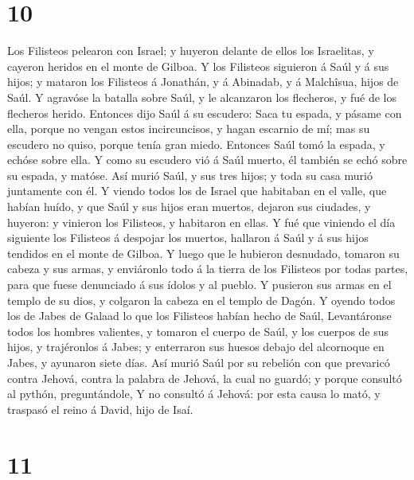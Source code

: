 \hypertarget{section-9}{%
\section{10}\label{section-9}}

 Los Filisteos pelearon con Israel; y huyeron delante de
ellos los Israelitas, y cayeron heridos en el monte de Gilboa.
 Y los Filisteos siguieron á Saúl y á sus hijos; y mataron
los Filisteos á Jonathán, y á Abinadab, y á Malchîsua, hijos de Saúl.
 Y agravóse la batalla sobre Saúl, y le alcanzaron los
flecheros, y fué de los flecheros herido.  Entonces dijo
Saúl á su escudero: Saca tu espada, y pásame con ella, porque no vengan
estos incircuncisos, y hagan escarnio de mí; mas su escudero no quiso,
porque tenía gran miedo. Entonces Saúl tomó la espada, y echóse sobre
ella.  Y como su escudero vió á Saúl muerto, él también se
echó sobre su espada, y matóse.  Así murió Saúl, y sus tres
hijos; y toda su casa murió juntamente con él.  Y viendo
todos los de Israel que habitaban en el valle, que habían huído, y que
Saúl y sus hijos eran muertos, dejaron sus ciudades, y huyeron: y
vinieron los Filisteos, y habitaron en ellas.  Y fué que
viniendo el día siguiente los Filisteos á despojar los muertos, hallaron
á Saúl y á sus hijos tendidos en el monte de Gilboa.  Y
luego que le hubieron desnudado, tomaron su cabeza y sus armas, y
enviáronlo todo á la tierra de los Filisteos por todas partes, para que
fuese denunciado á sus ídolos y al pueblo.  Y pusieron sus
armas en el templo de su dios, y colgaron la cabeza en el templo de
Dagón.  Y oyendo todos los de Jabes de Galaad lo que los
Filisteos habían hecho de Saúl,  Levantáronse todos los
hombres valientes, y tomaron el cuerpo de Saúl, y los cuerpos de sus
hijos, y trajéronlos á Jabes; y enterraron sus huesos debajo del
alcornoque en Jabes, y ayunaron siete días.  Así murió Saúl
por su rebelión con que prevaricó contra Jehová, contra la palabra de
Jehová, la cual no guardó; y porque consultó al pythón, preguntándole,
 Y no consultó á Jehová: por esta causa lo mató, y traspasó
el reino á David, hijo de Isaí.

\hypertarget{section-10}{%
\section{11}\label{section-10}}

